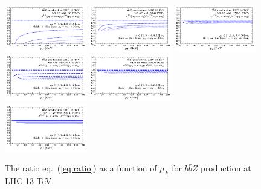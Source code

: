 \documentclass[letter,11pt]{article}
\begin{document}
%
%
\begin{figure}[t]
\centering
\includegraphics[trim=0.3cm 0.0cm 0.5cm 0.5cm,clip,width=0.32\textwidth]{./zbb_mubdep_lo_lopdfs.pdf}
\includegraphics[trim=0.3cm 0.0cm 0.5cm 0.5cm,clip,width=0.32\textwidth]{./zbb_mubdep_lo_nlopdfs.pdf}
\includegraphics[trim=0.3cm 0.0cm 0.5cm 0.5cm,clip,width=0.32\textwidth]{./zbb_mubdep_lo_nnlopdfs.pdf}\\
\vskip -3.5mm
\hskip 51mm
\includegraphics[trim=0.3cm 0.0cm 0.5cm 0.5cm,clip,width=0.32\textwidth]{./zbb_mubdep_nlo_nlopdfs.pdf}
\includegraphics[trim=0.3cm 0.0cm 0.5cm 0.5cm,clip,width=0.32\textwidth]{./zbb_mubdep_nlo_nnlopdfs.pdf} \\
\vskip -3.5mm
\hskip 102mm
\includegraphics[trim=0.3cm 0.0cm 0.5cm 0.5cm,clip,width=0.32\textwidth]{./zbb_mubdep_nnlo_nnlopdfs.pdf} \\
\vskip -2mm
\caption{The ratio eq.~(\ref{eq:ratio}) as a function of $\mu_F$ for $b\bar{b}Z$ production at LHC 13 TeV.}
\label{fig:bbz-mub-dep}
\end{figure}
\end{document}
